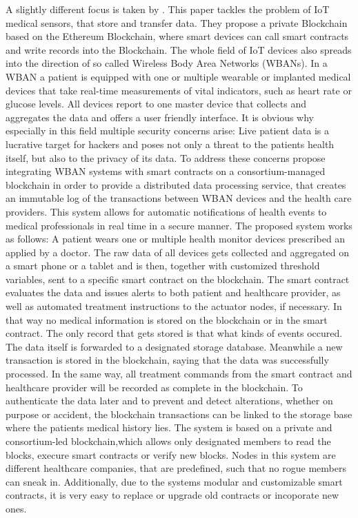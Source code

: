 A slightly different focus is taken by \citeauthor{Baccarini2018}. This paper tackles the problem of IoT medical sensors, that store and transfer data. They propose a private Blockchain based on the Ethereum Blockchain, where smart devices can call smart contracts and write records into the Blockchain.
The whole field of IoT devices also spreads into the direction of so called Wireless Body Area Networks (WBANs). In a WBAN a patient is equipped with one or multiple wearable or implanted medical devices that take real-time measurements of vital indicators, such as heart rate or glucose levels. All devices report to one master device that collects and aggregates the data and offers a user friendly interface. 
It is obvious why especially in this field multiple security concerns arise: Live patient data is a lucrative target for hackers and poses not only a threat to the patients health itself, but also to the privacy of its data.
To address these concerns \citeauthor{Baccarini2018} propose integrating WBAN systems with smart contracts on a consortium-managed blockchain in order to provide a distributed data processing service, that creates an immutable log of the transactions between WBAN devices and the health care providers. This system allows for automatic notifications of health events to medical professionals in real time in a secure manner. 
The proposed system works as follows:  
A patient wears one or multiple health monitor devices prescribed an applied by a doctor. The raw data of all devices gets collected and aggregated on a smart phone or a tablet and is then, together with customized threshold variables, sent to a specific smart contract on the blockchain. The smart contract evaluates the data and issues alerts to both patient and healthcare provider, as well as automated treatment instructions to the actuator nodes, if necessary.
In that way no medical information is stored on the blockchain or in the smart contract. The only record that gets stored is that what kinds of  events occured. The data itself is forwarded to a designated storage database. Meanwhile a new transaction is stored in the blockchain, saying that the data was successfully processed. In the same way, all treatment commands from the smart contract and healthcare provider will be recorded as complete in the blockchain.
To authenticate the data later and to prevent and detect alterations, whether on purpose or accident, the blockchain transactions can be linked to the storage base where the patients medical history lies.
The system is based on a private and consortium-led blockchain,which allows only designated members to read the blocks, execure smart contracts or verify new blocks.
Nodes in this system are different healthcare companies, that are predefined, such that no rogue members can sneak in.
Additionally, due to the systems modular and customizable smart contracts, it is very easy to replace or upgrade old contracts or incoporate new ones.

